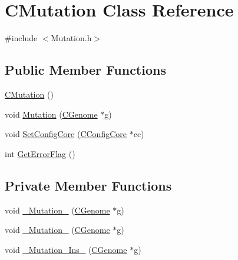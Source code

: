 \hypertarget{classCMutation}{
\section{CMutation Class Reference}
\label{classCMutation}
}


{\ttfamily \#include $<$Mutation.h$>$}\subsection*{Public Member Functions}
\begin{DoxyCompactItemize}
\item 
\hyperlink{classCMutation_ad52e2648f1e7a288706dfa1d429b74c4}{CMutation} ()
\item 
void \hyperlink{classCMutation_a011d0153e14d5551a0bb1993e029fa75}{Mutation} (\hyperlink{classCGenome}{CGenome} $\ast$g)
\item 
void \hyperlink{classCMutation_ae5d1555611f0c19de65c237d16ff3536}{SetConfigCore} (\hyperlink{classCConfigCore}{CConfigCore} $\ast$cc)
\item 
int \hyperlink{classCMutation_afa507d1edb86b5fdc33ec4e88b54ad71}{GetErrorFlag} ()
\end{DoxyCompactItemize}
\subsection*{Private Member Functions}
\begin{DoxyCompactItemize}
\item 
void \hyperlink{classCMutation_abaf0adf86b76dcce975cb6a10173730d}{\_\-Mutation\_} (\hyperlink{classCGenome}{CGenome} $\ast$g)
\item 
void \hyperlink{classCMutation_a9ea86e30d04f615dca21f594f51ec491}{\_\-Mutation\_} (\hyperlink{classCGenome}{CGenome} $\ast$g)
\item 
void \hyperlink{classCMutation_a1a38ef4c6a010eebddacc6eaf1b9e758}{\_\-Mutation\_\-Ins\_} (\hyperlink{classCGenome}{CGenome} $\ast$g)
\end{DoxyCompactItemize}
